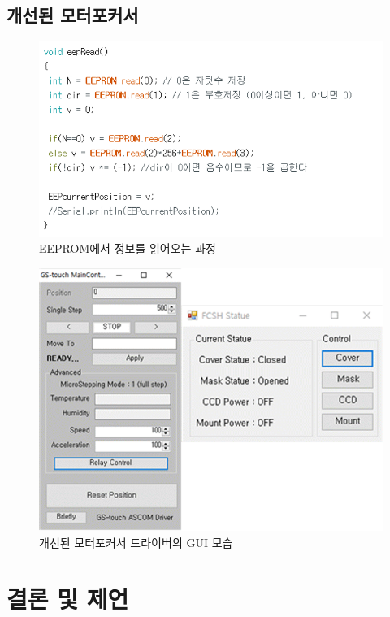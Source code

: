 \documentclass[twoside,11pt]{gshs_thesis}
\begin{document}
\newpage
\subsection{개선된 모터포커서}


 \begin{figure}[h]
	\begin{center}
		\includegraphics[width = 12cm]{eepread}
	\end{center}
	\caption{EEPROM에서 정보를 읽어오는 과정}
	\label{eepread}
\end{figure}

 \begin{figure}[h]
	\begin{center}
		\includegraphics[width = 12cm]{maincontrol}
	\end{center}
	\caption{개선된 모터포커서 드라이버의 GUI 모습}
	\label{maincontrol}
\end{figure}



\newpage
\section{결론 및 제언}
\end{document}
